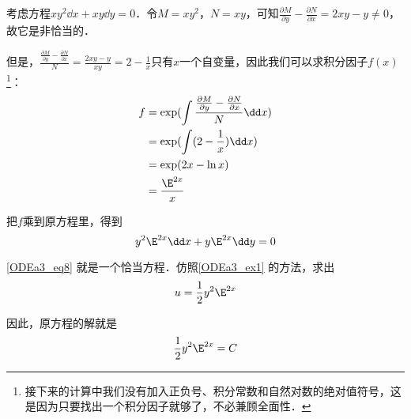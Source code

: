 \begin{example}{}
考虑方程$xy^2\dd x+xy\dd y=0$．令$M=xy^2$，$N=xy$，可知$\frac{\partial M}{\partial y}-\frac{\partial N}{\partial x}=2xy-y\not=0$，故它是非恰当的．

但是，$\frac{\frac{\partial M}{\partial y}-\frac{\partial N}{\partial x}}{N}=\frac{2xy-y}{xy}=2-\frac{1}{x}$只有$x$一个自变量，因此我们可以求积分因子$f(x)$\footnote{接下来的计算中我们没有加入正负号、积分常数和自然对数的绝对值符号，这是因为只要找出一个积分因子就够了，不必兼顾全面性．}：
\begin{equation}
\begin{aligned}
f&=\exp(\int \frac{\frac{\partial M}{\partial y}-\frac{\partial N}{\partial x}}{N}\dd x)\\
&=\exp(\int(2-\frac{1}{x})\dd x)\\
&=\exp(2x-\ln x)\\
&=\frac{\E^{2x}}{x}
\end{aligned}
\end{equation}

把$f$乘到原方程里，得到
\begin{equation}\label{ODEa3_eq8}
y^2\E^{2x}\dd x+y\E^{2x}\dd y=0
\end{equation}

\autoref{ODEa3_eq8} 就是一个恰当方程．仿照\autoref{ODEa3_ex1} 的方法，求出
\begin{equation}
u=\frac{1}{2}y^2\E^{2x}
\end{equation}

因此，原方程的解就是
\begin{equation}
\frac{1}{2}y^2\E^{2x}=C
\end{equation}


\end{example}













